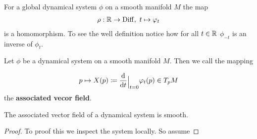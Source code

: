 \begin{corollary}
	For a global dynamical system $\phi$ on a smooth manifold $M$ the map
	\begin{align*}
		\rho: \mathbb{R} \to \operatorname{\mathrm{Diff}},~t\mapsto \varphi_t
	\end{align*}is a homomorphism. To see the well definition notice how for all $t\in \mathbb{R}$ $\phi_{-t}$ is an inverse of $\phi_t$.
\end{corollary}
\begin{definition}
Let $\phi$ be a dynamical system on a smooth manifold $M$. Then we call the mapping

\begin{align*}
	p\mapsto X(p)\coloneq \frac{\diff }{\diff t}\einsch{t=0}\phi_t(p)\in T_pM
\end{align*} the \textbf{associated vecor field}.
\end{definition}
\begin{cor}
	The associated vector field of a dynamical system is smooth. 
\end{cor}
\begin{proof}
	To proof this we inspect the system locally. So assume 
\end{proof}